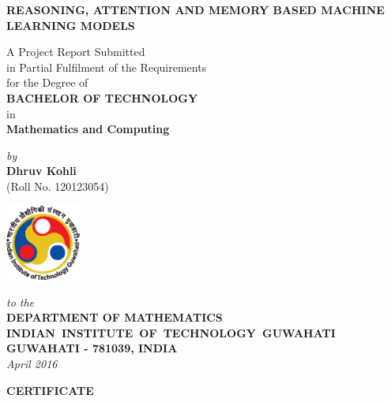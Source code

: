 \documentclass[12pt,a4paper]{report}
\theoremstyle{plain}
\theoremstyle{definition}
\theoremstyle{remark}
\begin{document}

\begin{titlepage}
\enlargethispage{3cm}

\begin{center}

\vspace*{-2cm}

\textbf{\Large REASONING, ATTENTION AND MEMORY BASED MACHINE LEARNING MODELS}

\vfill

 A Project Report Submitted \\
 in Partial Fulfilment of the Requirements  \\
  for the Degree of  \\[10pt]

 {\Large \bf BACHELOR OF TECHNOLOGY}\\[5pt]
 in \\
 {\large \bf Mathematics and Computing}

 \vfill

{\large \emph{by}}\\[5pt]
{\large\bf {Dhruv Kohli}}\\[5pt]
{\large (Roll No. 120123054)}

\vfill
\includegraphics[height=2.5cm]{iitglogo.eps}

\vspace*{0.5cm}

{\em\large to the}\\[10pt]
{\bf\large DEPARTMENT OF MATHEMATICS} \\[5pt]
{\bf\large \mbox{INDIAN INSTITUTE OF TECHNOLOGY GUWAHATI}}\\[5pt]
{\bf\large GUWAHATI - 781039, INDIA}\\[10pt]
{\it\large April 2016}
\end{center}

\end{titlepage}

\clearpage

 \setcounter{page}{2}
\begin{center}
{\Large{\bf{CERTIFICATE}}}
\end{center}
\end{document}
